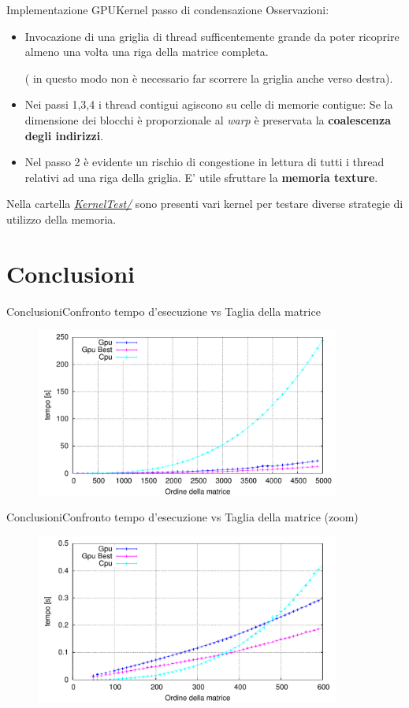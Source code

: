 \documentclass{beamer} %
\begin{document}
\begin{frame}{Implementazione GPU}{Kernel passo di condensazione}
Osservazioni:\pause
\begin{itemize}
\item Invocazione di una griglia di thread sufficentemente grande da poter ricoprire almeno una volta una riga della matrice completa. \begin{tiny}
( in questo modo non è necessario far scorrere la griglia anche verso destra).
\end{tiny}\pause
\item Nei passi 1,3,4 i thread contigui agiscono su celle di memorie contigue: Se la dimensione dei blocchi è proporzionale al \emph{warp} è preservata la  \textbf{coalescenza degli indirizzi}.\pause
\item Nel passo 2 è evidente un rischio di congestione in lettura di tutti i thread relativi ad una riga della griglia. E' utile sfruttare la \textbf{memoria texture}. \pause
\end{itemize}
\vspace{1cm}
Nella cartella \href{run:/home/tony/CudaCorso/ProgettoFinale/KernelTest/condensation_tentative.cuh}{\color{red}  \emph{KernelTest/}} sono presenti vari kernel per testare diverse strategie di utilizzo della memoria.
\end{frame}

\section{Conclusioni}
\begin{frame}{Conclusioni}{Confronto tempo d'esecuzione vs Taglia della matrice}
\begin{figure}[ht!]
	\centering
	\includegraphics[width=100mm]{TimevsN.pdf}
\end{figure}
\end{frame}

\begin{frame}{Conclusioni}{Confronto tempo d'esecuzione vs Taglia della matrice (zoom)}
\begin{figure}[ht!]
	\centering
	\includegraphics[width=100mm]{TimevsN_Zoom.pdf}
\end{figure}
\end{frame}
\end{document}
